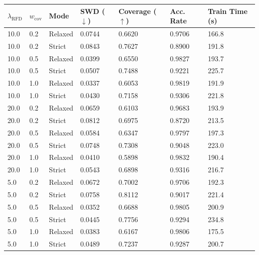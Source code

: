 \begin{tabular}{lllllll}
\toprule
$\lambda_{\mathrm{RFD}}$ & $w_{\mathrm{cov}}$ & Mode & SWD ($\downarrow$) & Coverage ($\uparrow$) & Acc. Rate & Train Time (s) \\
\midrule
10.0 & 0.2 & Relaxed & 0.0744 & 0.6620 & 0.9706 & 166.8 \\
10.0 & 0.2 & Strict & 0.0843 & 0.7627 & 0.8900 & 191.8 \\
10.0 & 0.5 & Relaxed & 0.0399 & 0.6550 & 0.9827 & 193.7 \\
10.0 & 0.5 & Strict & 0.0507 & 0.7488 & 0.9221 & 225.7 \\
10.0 & 1.0 & Relaxed & 0.0337 & 0.6053 & 0.9819 & 191.9 \\
10.0 & 1.0 & Strict & 0.0430 & 0.7158 & 0.9306 & 221.8 \\
20.0 & 0.2 & Relaxed & 0.0659 & 0.6103 & 0.9683 & 193.9 \\
20.0 & 0.2 & Strict & 0.0812 & 0.6975 & 0.8720 & 213.5 \\
20.0 & 0.5 & Relaxed & 0.0584 & 0.6347 & 0.9797 & 197.3 \\
20.0 & 0.5 & Strict & 0.0748 & 0.7308 & 0.9048 & 223.0 \\
20.0 & 1.0 & Relaxed & 0.0410 & 0.5898 & 0.9832 & 190.4 \\
20.0 & 1.0 & Strict & 0.0543 & 0.6898 & 0.9316 & 216.7 \\
5.0 & 0.2 & Relaxed & 0.0672 & 0.7002 & 0.9706 & 192.3 \\
5.0 & 0.2 & Strict & 0.0758 & 0.8112 & 0.9017 & 221.4 \\
5.0 & 0.5 & Relaxed & 0.0352 & 0.6688 & 0.9805 & 200.9 \\
5.0 & 0.5 & Strict & 0.0445 & 0.7756 & 0.9294 & 234.8 \\
5.0 & 1.0 & Relaxed & 0.0383 & 0.6167 & 0.9806 & 175.5 \\
5.0 & 1.0 & Strict & 0.0489 & 0.7237 & 0.9287 & 200.7 \\
\bottomrule
\end{tabular}
